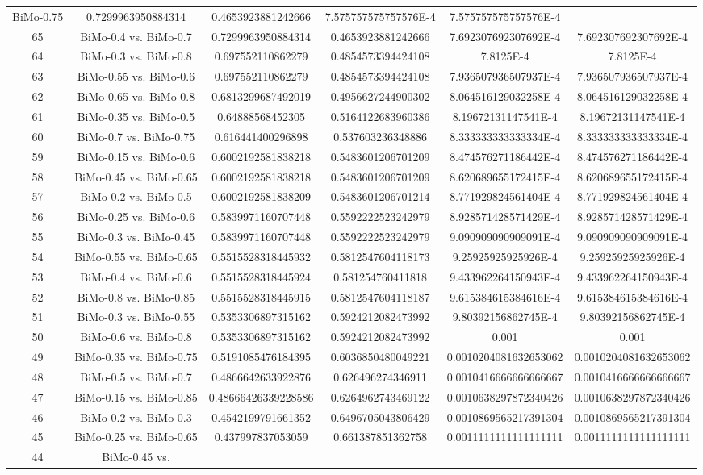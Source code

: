 \documentclass[a4paper,10pt]{article}
\begin{document}
\begin{landscape}
\begin{table}[!htp]
\begin{tabular}{cccccc}
BiMo-0.75&0.7299963950884314&0.4653923881242666&7.575757575757576E-4&7.575757575757576E-4\\65&BiMo-0.4 vs. BiMo-0.7&0.7299963950884314&0.4653923881242666&7.692307692307692E-4&7.692307692307692E-4\\64&BiMo-0.3 vs. BiMo-0.8&0.697552110862279&0.4854573394424108&7.8125E-4&7.8125E-4\\63&BiMo-0.55 vs. BiMo-0.6&0.697552110862279&0.4854573394424108&7.936507936507937E-4&7.936507936507937E-4\\62&BiMo-0.65 vs. BiMo-0.8&0.6813299687492019&0.4956627244900302&8.064516129032258E-4&8.064516129032258E-4\\61&BiMo-0.35 vs. BiMo-0.5&0.64888568452305&0.5164122683960386&8.19672131147541E-4&8.19672131147541E-4\\60&BiMo-0.7 vs. BiMo-0.75&0.616441400296898&0.537603236348886&8.333333333333334E-4&8.333333333333334E-4\\59&BiMo-0.15 vs. BiMo-0.6&0.6002192581838218&0.5483601206701209&8.474576271186442E-4&8.474576271186442E-4\\58&BiMo-0.45 vs. BiMo-0.65&0.6002192581838218&0.5483601206701209&8.620689655172415E-4&8.620689655172415E-4\\57&BiMo-0.2 vs. BiMo-0.5&0.6002192581838209&0.5483601206701214&8.771929824561404E-4&8.771929824561404E-4\\56&BiMo-0.25 vs. BiMo-0.6&0.5839971160707448&0.5592222523242979&8.928571428571429E-4&8.928571428571429E-4\\55&BiMo-0.3 vs. BiMo-0.45&0.5839971160707448&0.5592222523242979&9.090909090909091E-4&9.090909090909091E-4\\54&BiMo-0.55 vs. BiMo-0.65&0.5515528318445932&0.5812547604118173&9.25925925925926E-4&9.25925925925926E-4\\53&BiMo-0.4 vs. BiMo-0.6&0.5515528318445924&0.581254760411818&9.433962264150943E-4&9.433962264150943E-4\\52&BiMo-0.8 vs. BiMo-0.85&0.5515528318445915&0.5812547604118187&9.615384615384616E-4&9.615384615384616E-4\\51&BiMo-0.3 vs. BiMo-0.55&0.5353306897315162&0.5924212082473992&9.80392156862745E-4&9.80392156862745E-4\\50&BiMo-0.6 vs. BiMo-0.8&0.5353306897315162&0.5924212082473992&0.001&0.001\\49&BiMo-0.35 vs. BiMo-0.75&0.5191085476184395&0.6036850480049221&0.0010204081632653062&0.0010204081632653062\\48&BiMo-0.5 vs. BiMo-0.7&0.4866642633922876&0.626496274346911&0.0010416666666666667&0.0010416666666666667\\47&BiMo-0.15 vs. BiMo-0.85&0.48666426339228586&0.6264962743469122&0.0010638297872340426&0.0010638297872340426\\46&BiMo-0.2 vs. BiMo-0.3&0.4542199791661352&0.6496705043806429&0.0010869565217391304&0.0010869565217391304\\45&BiMo-0.25 vs. BiMo-0.65&0.437997837053059&0.661387851362758&0.0011111111111111111&0.0011111111111111111\\44&BiMo-0.45 vs. 
\end{tabular}
\end{table}
\end{landscape}
\end{document}
